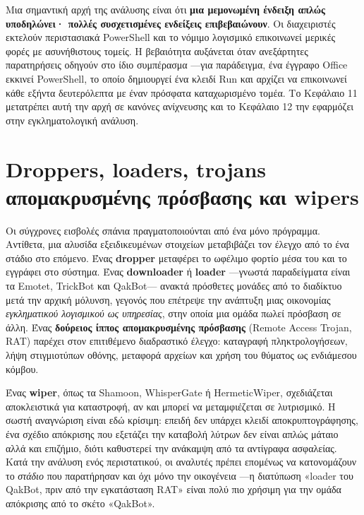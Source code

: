 Μια σημαντική αρχή της ανάλυσης είναι ότι \textbf{μια μεμονωμένη ένδειξη απλώς υποδηλώνει· πολλές συσχετισμένες ενδείξεις επιβεβαιώνουν}. Οι διαχειριστές εκτελούν περιστασιακά PowerShell και το νόμιμο λογισμικό επικοινωνεί μερικές φορές με ασυνήθιστους τομείς. Η βεβαιότητα αυξάνεται όταν ανεξάρτητες παρατηρήσεις οδηγούν στο ίδιο συμπέρασμα —για παράδειγμα, ένα έγγραφο Office εκκινεί PowerShell, το οποίο δημιουργεί ένα κλειδί Run και αρχίζει να επικοινωνεί κάθε εξήντα δευτερόλεπτα με έναν πρόσφατα καταχωρισμένο τομέα. Το Κεφάλαιο 11 μετατρέπει αυτή την αρχή σε κανόνες ανίχνευσης και το Κεφάλαιο 12 την εφαρμόζει στην εγκληματολογική ανάλυση.

\section{Droppers, loaders, trojans απομακρυσμένης πρόσβασης και wipers}\label{sec:4.4}
Οι σύγχρονες εισβολές σπάνια πραγματοποιούνται από ένα μόνο πρόγραμμα. Αντίθετα, μια αλυσίδα εξειδικευμένων στοιχείων μεταβιβάζει τον έλεγχο από το ένα στάδιο στο επόμενο. Ένας \textbf{dropper} μεταφέρει το ωφέλιμο φορτίο μέσα του και το εγγράφει στο σύστημα. Ένας \textbf{downloader} ή \textbf{loader} —γνωστά παραδείγματα είναι τα Emotet, TrickBot και QakBot— ανακτά πρόσθετες μονάδες από το διαδίκτυο μετά την αρχική μόλυνση, γεγονός που επέτρεψε την ανάπτυξη μιας οικονομίας \emph{εγκληματικού λογισμικού ως υπηρεσίας}, στην οποία μια ομάδα πωλεί πρόσβαση σε άλλη. Ένας \textbf{δούρειος ίππος απομακρυσμένης πρόσβασης} (Remote Access Trojan, RAT) παρέχει στον επιτιθέμενο διαδραστικό έλεγχο: καταγραφή πληκτρολογήσεων, λήψη στιγμιοτύπων οθόνης, μεταφορά αρχείων και χρήση του θύματος ως ενδιάμεσου κόμβου.

Ένας \textbf{wiper}, όπως τα Shamoon, WhisperGate ή HermeticWiper, σχεδιάζεται αποκλειστικά για καταστροφή, αν και μπορεί να μεταμφιέζεται σε λυτρισμικό. Η σωστή αναγνώριση είναι εδώ κρίσιμη: επειδή δεν υπάρχει κλειδί αποκρυπτογράφησης, ένα σχέδιο απόκρισης που εξετάζει την καταβολή λύτρων δεν είναι απλώς μάταιο αλλά και επιζήμιο, διότι καθυστερεί την ανάκαμψη από τα αντίγραφα ασφαλείας. Κατά την ανάλυση ενός περιστατικού, οι αναλυτές πρέπει επομένως να κατονομάζουν το \emph{στάδιο} που παρατήρησαν και όχι μόνο την οικογένεια —η διατύπωση «loader του QakBot, πριν από την εγκατάσταση RAT» είναι πολύ πιο χρήσιμη για την ομάδα απόκρισης από το σκέτο «QakBot».

